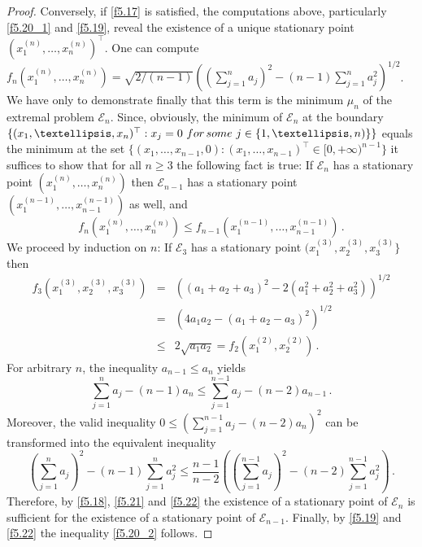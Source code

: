 \documentclass[10pt,a4paper]{amsart}
\begin{document}
\begin{proof}
Conversely, if \eqref{f5.17} is satisfied, the computations above, particularly \eqref{f5.20_1} and \eqref{f5.19}, reveal the existence of a unique stationary point $(x_1^{(n)},\ldots,x_n^{(n)})^\top$. One can compute $f_n(x_1^{(n)},\ldots,x_n^{(n)}) = \sqrt{2/(n-1)} \left((\sum_{j=1}^n a_j)^2 - (n-1) \sum_{j=1}^n a_j^2 \right)^{1/2}$. We have only to demonstrate finally that this term is the minimum $\mu_n$ of the extremal problem ${\mathcal E}_n$. Since, obviously, the minimum of ${\mathcal E}_n$ at the boundary $\{ (x_1,\ldots,x_n)^\top : x_j=0 \,\, {\rm for} \, {\rm some} \,\, j \in \{1,\ldots,n)\}\}$ equals the minimum at the set $\{ (x_1,\ldots,x_{n-1},0): (x_1,\ldots,x_{n-1})^\top \in [0,+\infty)^{n-1} \}$ it suffices to show that for all $n \geq 3$ the following fact is true: If ${\mathcal E}_n$ has a stationary point $(x_1^{(n)}, \ldots , x_n^{(n)} )$ then ${\mathcal E}_{n-1}$ has a stationary point $(x_1^{(n-1)}, \ldots , x_{n-1}^{(n-1)} )$ as well, and 
\begin{equation}  \label{f5.20_2}
    f_n(x_1^{(n)},\ldots,x_n^{(n)}) \leq f_{n-1}(x_1^{(n-1)},\ldots,x_{n-1}^{(n-1)}) \, .
\end{equation}    
We proceed by induction on $n$: If ${\mathcal E}_3$ has a stationary point $(x_1^{(3)},x_2^{(3)},x_3^{(3)} \}$ then 
\begin{eqnarray*}
          f_3(x_1^{(3)},x_2^{(3)},x_3^{(3)}) & = & ((a_1+a_2+a_3)^2 -2(a_1^2+a_2^2+a_3^2))^{1/2} \\
                                                               & = &  (4a_1a_2 - (a_1+a_2-a_3)^2)^{1/2} \\
                                                            & \leq & 2 \sqrt{a_1a_2} = f_2(x_1^{(2)},x_2^{(2)}) \, .
\end{eqnarray*}
For arbitrary $n$, the inequality $a_{n-1} \leq a_n$ yields
\begin{equation} \label{f5.21}
      \sum_{j=1}^n a_j - (n-1) a_n \leq \sum_{j=1}^{n-1} a_j - (n-2) a_{n-1} \, .
\end{equation}
Moreover, the valid inequality $0 \leq (\sum_{j=1}^{n-1} a_j - (n-2) a_n)^2$ can be transformed into the equivalent inequality
\begin{equation}    \label{f5.22}
      ( \sum_{j=1}^n a_j )^2 - (n-1) \sum_{j=1}^n a_j^2 \leq \frac{n-1}{n-2} \left(  (\sum_{j=1}^{n-1} a_j)^2 - (n-2) \sum_{j=1}^{n-1} a_j^2\right) \, .
\end{equation}
Therefore, by \eqref{f5.18}, \eqref{f5.21} and \eqref{f5.22} the existence of a stationary point of ${\mathcal E}_n$ is sufficient for the existence of a stationary point of ${\mathcal E}_{n-1}$. Finally, by \eqref{f5.19} and \eqref{f5.22} the inequality \eqref{f5.20_2} follows. 
\end{proof}   
\end{document}
